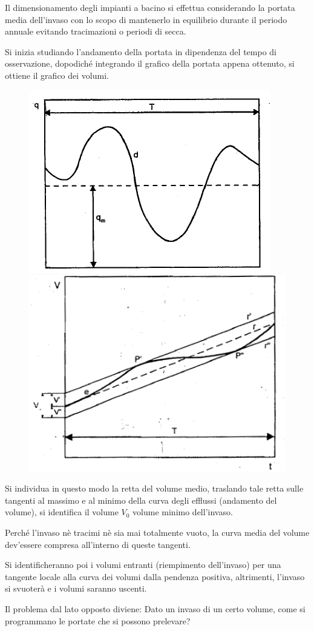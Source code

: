 \documentclass[a4paper, 15pt]{article}
\begin{document}
\begin{adjustwidth}{2in}{}
	Il dimensionamento degli impianti a bacino si effettua considerando la portata media dell'invaso con lo scopo di mantenerlo in equilibrio durante il periodo annuale evitando tracimazioni o periodi di secca. 
	
	Si inizia studiando l'andamento della portata in dipendenza del tempo di osservazione, dopodiché integrando il grafico della portata appena ottenuto, si ottiene il grafico dei volumi.	
\begin{figure}[H]
	\centering
	\includegraphics[width=0.4\linewidth]{immagini/caputo5}
	\label{fig:caputo5}
	\includegraphics[width=0.4\linewidth]{immagini/caputo6}
	\label{fig:caputo6}	
\end{figure}
	Si individua in questo modo la retta del volume medio, traslando tale retta sulle tangenti al massimo e al minimo della curva degli efflussi (andamento del volume), si identifica il volume $V_0$ volume minimo dell'invaso. 

	Perché l'invaso nè tracimi nè sia mai totalmente vuoto, la curva media del volume dev'essere compresa all'interno di queste tangenti. 
	
	Si identificheranno poi i volumi entranti (riempimento dell'invaso) per una tangente locale alla curva dei volumi dalla pendenza positiva, altrimenti, l'invaso si svuoterà e i volumi saranno uscenti. \newline 
	
	Il problema dal lato opposto diviene: Dato un invaso di un certo volume, come si programmano le portate che si possono prelevare? 


\end{adjustwidth}
\end{document}
